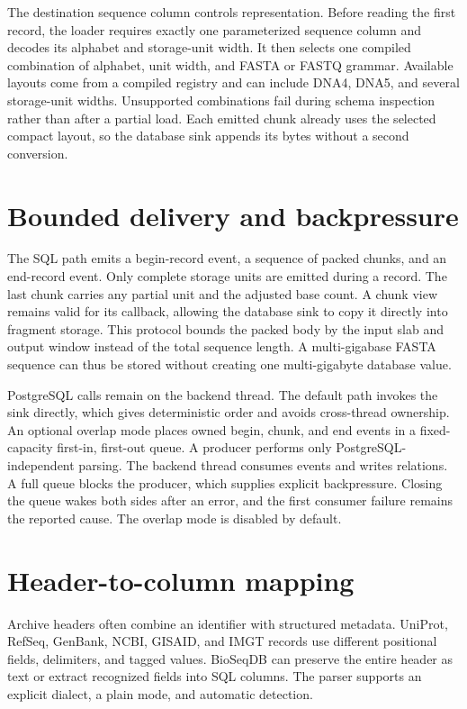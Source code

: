 The destination sequence column controls representation. Before reading the
first record, the loader requires exactly one parameterized sequence column
and decodes its alphabet and storage-unit width. It then selects one compiled
combination of alphabet, unit width, and FASTA or FASTQ grammar. Available
layouts come from a compiled registry and can include DNA4, DNA5, and several
storage-unit widths. Unsupported combinations fail during schema inspection
rather than after a partial load. Each emitted chunk already uses the selected
compact layout, so the database sink appends its bytes without a second
conversion.

\section{Bounded delivery and backpressure}
\label{sec:io-bounds}

The SQL path emits a begin-record event, a sequence of packed chunks, and an
end-record event. Only complete storage units are emitted during a record. The
last chunk carries any partial unit and the adjusted base count. A chunk view
remains valid for its callback, allowing the database sink to copy it
directly into fragment storage. This protocol bounds the packed body by the
input slab and output window instead of the total sequence length. A
multi-gigabase FASTA sequence can thus be stored without creating one
multi-gigabyte database value.

PostgreSQL calls remain on the backend thread. The default path invokes the
sink directly, which gives deterministic order and avoids cross-thread
ownership. An optional overlap mode places owned begin, chunk, and end events
in a fixed-capacity first-in, first-out queue. A producer performs only
PostgreSQL-independent parsing. The backend thread consumes events and writes
relations. A full queue blocks the producer, which supplies explicit
backpressure. Closing the queue wakes both sides after an error, and the first
consumer failure remains the reported cause. The overlap mode is disabled by
default.

\section{Header-to-column mapping}
\label{sec:io-header-mapping}

Archive headers often combine an identifier with structured metadata.
UniProt, RefSeq, GenBank, NCBI, GISAID, and IMGT records use different
positional fields, delimiters, and tagged values. BioSeqDB can preserve the
entire header as text or extract recognized fields into SQL columns. The
parser supports an explicit dialect, a plain mode, and automatic detection.

